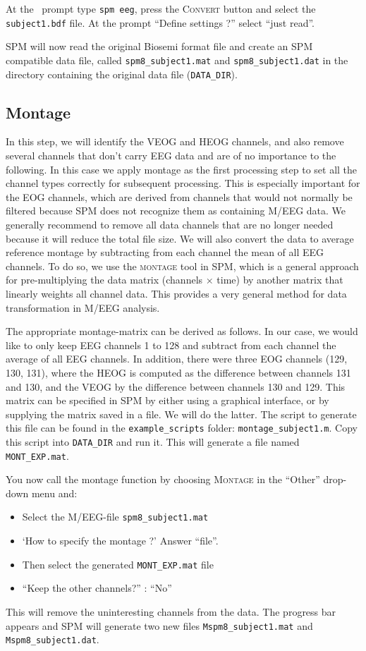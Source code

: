 At the \matlab\ prompt type \texttt{spm eeg}, press the \textsc{Convert} button and select the \texttt{subject1.bdf} file. At the prompt ``Define settings ?'' select ``just read''.

SPM will now read the original Biosemi format file and create an SPM compatible data file, called \texttt{spm8\_subject1.mat} and \texttt{spm8\_subject1.dat} in the directory containing the original data file (\texttt{DATA\_DIR}).

\subsection{Montage}

In this step, we will identify the VEOG and HEOG channels, and also remove several channels that don't carry EEG data and are of no importance to the following. In this case we apply montage as the first processing step to set all the channel types correctly for subsequent processing. This is especially important for the EOG channels, which are derived from channels that would not normally be filtered because SPM does not recognize them as containing M/EEG data. We generally recommend to remove all data channels that are no longer needed because it will reduce the total file size. We will also convert the data to average reference montage by subtracting from each channel the mean of all EEG channels. To do so, we use the \textsc{montage} tool in SPM, which is a general approach for pre-multiplying the data matrix (channels $\times$ time) by another matrix that linearly weights all channel data. This provides a very general method for data transformation in M/EEG analysis.

The appropriate montage-matrix can be derived as follows.
In our case, we would like to only keep EEG channels 1 to 128 and subtract from each channel the average of all EEG channels. In addition, there were three EOG channels (129, 130, 131), where the HEOG is computed as the difference between channels 131 and 130, and the VEOG by the difference between channels 130 and 129. This matrix can be specified in SPM by either using a graphical interface, or by supplying the matrix saved in a file. We will do the latter. The script to generate this file can be found in the \texttt{example\_scripts} folder: \texttt{montage\_subject1.m}. Copy this script into \texttt{DATA\_DIR} and run it. This will generate a file named \texttt{MONT\_EXP.mat}.

You now call the montage function by choosing \textsc{Montage} in the ``Other'' drop-down menu and:
\begin{itemize}
\item{Select the M/EEG-file \texttt{spm8\_subject1.mat}}
\item{`How to specify the montage ?' Answer ``file''.}
\item{Then select the generated \texttt{MONT\_EXP.mat} file}
\item{``Keep the other channels?'' : ``No''}
\end{itemize}
This will remove the uninteresting channels from the data. The progress bar appears and SPM will generate two new files \texttt{Mspm8\_subject1.mat} and \texttt{Mspm8\_subject1.dat}.

